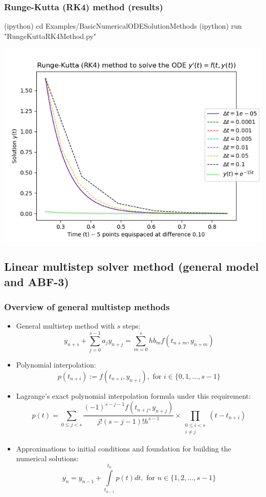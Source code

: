 \documentclass[usenames,svgnames,dvipsnames,10pt]{beamer}
\begin{document}
\begin{frame}[fragile]
\frametitle{Runge-Kutta (RK4) method (results)}

\begin{center}
\begin{code}
(ipython) cd Examples/BasicNumericalODESolutionMethods
(ipython) run "RungeKuttaRK4Method.py"
\end{code}
\vskip -0.075cm
\includegraphics[height=0.76\textheight]{../Images/RungeKuttaRK4-PlotOutputs-StepSizeHComparison-v2.png}
\end{center}

\end{frame}

\subsection{Linear multistep solver method (general model and ABF-3)}

\begin{frame}
\frametitle{Overview of general multistep methods}

\begin{itemize} 

\item General multistep method with $s$ steps: 
      $$y_{n+s} + \sum\limits_{j=0}^{s-1} a_j y_{n+j} = \sum\limits_{m=0}^s hb_m f(t_{n+m}, y_{n+m})$$
\item Polynomial interpolation: 
      $$p(t_{n+i}) := f(t_{n+i}, y_{n+i}), \text{ for } i \in \{0,1,\ldots,s-1\}$$
\item Lagrange's exact polynomial interpolation formula under this requirement: 
      $$p(t) = \sum\limits_{0 \leq j < s} \frac{(-1)^{s-j-1} f(t_{n+j}, y_{n+j})}{j! (s-j-1)! h^{s-1}} \times 
       \prod\limits_{\substack{0 \leq i < s \\ i \neq j}} (t-t_{n+i})$$ 
\item Approximations to initial conditions and foundation for building the numerical solutions: 
      $$y_{n} = y_{n-1} + \int\limits_{t_{n-1}}^{t_{n}} p(t) dt, \text{ for } n \in \{1, 2, \ldots, s-1\}$$ 

\end{itemize} 

\end{frame}
\end{document}
